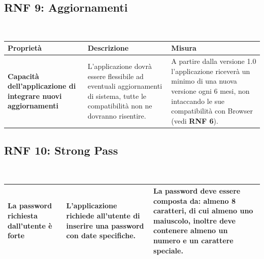 \documentclass{article}
\begin{document}
\subsection{RNF 9: Aggiornamenti}\\

\begin{tabular}{|p{4cm}|p{6cm}|p{4cm}|}
\hline
\textbf{Proprietà} & \textbf{Descrizione} & \textbf{Misura} \\
\hline
\textbf{Capacità dell’applicazione di integrare nuovi aggiornamenti} & L’applicazione dovrà essere flessibile ad eventuali aggiornamenti di sistema, tutte le compatibilità non ne dovranno risentire. & A partire dalla versione 1.0 l’applicazione riceverà un minimo di una nuova versione ogni 6 mesi, non intaccando le sue compatibilità con Browser (vedi \textbf{RNF 6}). \\
\hline

\end{tabular}



\subsection{RNF 10: Strong Pass}\\


\begin{tabular}{|p{4cm}|p{6cm}|p{4cm}|}
\hline
\textbf{La password richiesta dall’utente è forte} & L’applicazione richiede all’utente di inserire una password con date specifiche. & La password deve essere composta da: almeno 8 caratteri, di cui almeno uno maiuscolo, inoltre deve contenere almeno un numero e un carattere speciale. \\
\hline

\end{tabular}
\end{document}
